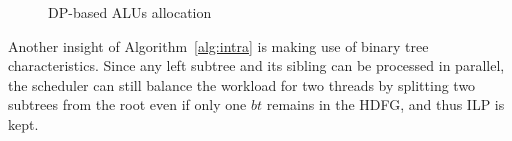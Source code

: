 \vspace{\textfig}
\begin{figure}[!ht]
    \begin{center}
        \hfill
        \hfill
    \end{center}
    \caption{DP-based ALUs allocation}
    \label{fig:alloc}
\end{figure}

\indent
Another insight of Algorithm~\ref{alg:intra} is making use of binary tree characteristics.
Since any left subtree and its sibling can be processed in parallel,
the scheduler can still balance the workload for two threads by splitting two subtrees from the root even if only one $bt$ remains in the HDFG, 
and thus ILP is kept.





